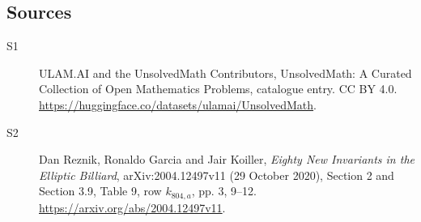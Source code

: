 \documentclass[11pt]{article}
\begin{document}
\subsection{Sources}
\begin{description}
\item[\hypertarget{source:statement:1}{S1}] ULAM.AI and the UnsolvedMath Contributors, UnsolvedMath: A Curated Collection of Open Mathematics Problems, catalogue entry. CC BY 4.0. \url{https://huggingface.co/datasets/ulamai/UnsolvedMath}.
\item[\hypertarget{source:statement:2}{S2}] Dan Reznik, Ronaldo Garcia and Jair Koiller, \emph{Eighty New Invariants in the Elliptic Billiard}, arXiv:2004.12497v11 (29 October 2020), Section 2 and Section 3.9, Table 9, row $k_{804,a}$, pp. 3, 9--12. \url{https://arxiv.org/abs/2004.12497v11}.
\end{description}
\label{end:statement}
\end{document}
